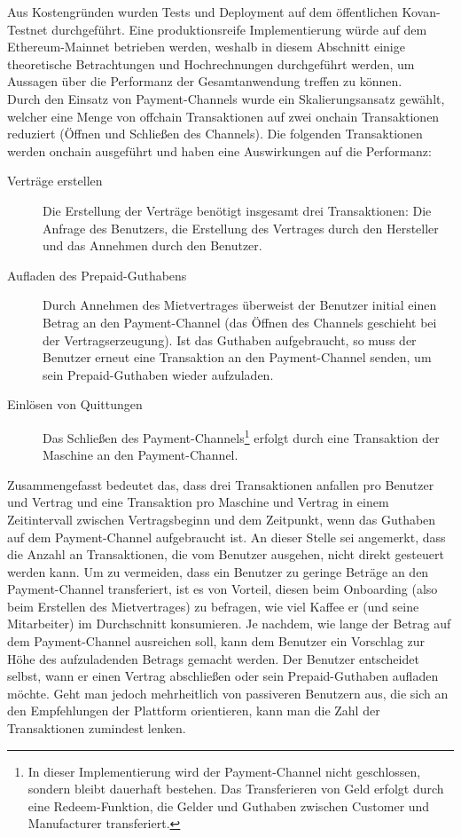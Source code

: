 Aus Kostengründen wurden Tests und Deployment auf dem öffentlichen Kovan-Testnet durchgeführt. Eine produktionsreife Implementierung würde auf dem Ethereum-Mainnet betrieben werden, weshalb in diesem Abschnitt einige theoretische Betrachtungen und Hochrechnungen durchgeführt werden, um Aussagen über die Performanz der Gesamtanwendung treffen zu können.\\
Durch den Einsatz von Payment-Channels wurde ein Skalierungsansatz gewählt, welcher eine Menge von offchain Transaktionen auf zwei onchain Transaktionen reduziert (Öffnen und Schließen des Channels). Die folgenden Transaktionen werden onchain ausgeführt und haben eine Auswirkungen auf die Performanz:
\begin{description}
  \item[Verträge erstellen] Die Erstellung der Verträge benötigt insgesamt drei Transaktionen: Die Anfrage des Benutzers, die Erstellung des Vertrages durch den Hersteller und das Annehmen durch den Benutzer.
  \item[Aufladen des Prepaid-Guthabens] Durch Annehmen des Mietvertrages überweist der Benutzer initial einen Betrag an den Payment-Channel (das Öffnen des Channels geschieht bei der Vertragserzeugung). Ist das Guthaben aufgebraucht, so muss der Benutzer erneut eine Transaktion an den Payment-Channel senden, um sein Prepaid-Guthaben wieder aufzuladen.
  \item[Einlösen von Quittungen] Das Schließen des Payment-Channels\footnote{In dieser Implementierung wird der Payment-Channel nicht geschlossen, sondern bleibt dauerhaft bestehen. Das Transferieren von Geld erfolgt durch eine Redeem-Funktion, die Gelder und Guthaben zwischen Customer und Manufacturer transferiert.} erfolgt durch eine Transaktion der Maschine an den Payment-Channel.\\
\end{description}
Zusammengefasst bedeutet das, dass drei Transaktionen anfallen pro Benutzer und Vertrag und eine Transaktion pro Maschine und Vertrag in einem Zeitintervall zwischen Vertragsbeginn und dem Zeitpunkt, wenn das Guthaben auf dem Payment-Channel aufgebraucht ist. An dieser Stelle sei angemerkt, dass die Anzahl an Transaktionen, die vom Benutzer ausgehen, nicht direkt gesteuert werden kann. Um zu vermeiden, dass ein Benutzer zu geringe Beträge an den Payment-Channel transferiert, ist es von Vorteil, diesen beim Onboarding (also beim Erstellen des Mietvertrages) zu befragen, wie viel Kaffee er (und seine Mitarbeiter) im Durchschnitt konsumieren. Je nachdem, wie lange der Betrag auf dem Payment-Channel ausreichen soll, kann dem Benutzer ein Vorschlag zur Höhe des aufzuladenden Betrags gemacht werden. Der Benutzer entscheidet selbst, wann er einen Vertrag abschließen oder sein Prepaid-Guthaben aufladen möchte. Geht man jedoch mehrheitlich von passiveren Benutzern aus, die sich an den Empfehlungen der Plattform orientieren, kann man die Zahl der Transaktionen zumindest lenken.\\
